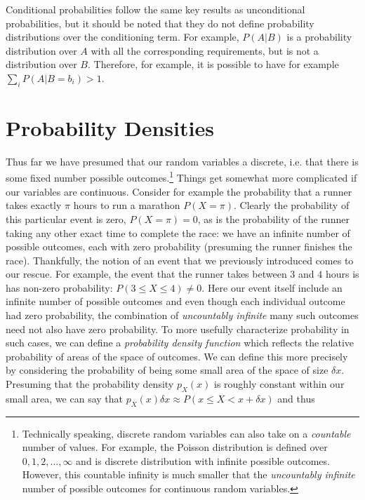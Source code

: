 Conditional probabilities follow  the same key results as unconditional probabilities, but it 
should be noted that they do not define probability distributions over the conditioning term.  
For example, $P(A|B)$ is a probability distribution over $A$ with all the corresponding 
requirements, but is not a distribution over $B$.  Therefore,
for example, it is possible to have for example $\sum_{i} P(A|B=b_i) >1$.

\section{Probability Densities}
\label{sec:prob:den}

Thus far we have presumed that our random variables a discrete, i.e. that there is some fixed
number possible outcomes.\footnote{Technically speaking, discrete random variables can also
	take on a \emph{countable} number of values.  For example, the Poisson distribution is defined
	over $0,1,2,\dots,\infty$ and is discrete distribution with infinite possible outcomes.  
	However, this countable infinity is much smaller that the \emph{uncountably infinite} number
	of possible outcomes for continuous random variables.}
Things get somewhat more complicated if our variables are continuous.  Consider for example
the probability that a runner takes exactly $\pi$ hours to run a marathon $P(X=\pi)$.  
Clearly the probability
of this particular event is zero, $P(X=\pi)=0$, as is the probability of the runner taking any other exact time
to complete the race: we have an infinite number of possible outcomes, each with zero probability
(presuming the runner finishes the race).  Thankfully, the notion of an event that we previously
introduced comes to our rescue.  For example, the event that the runner takes between $3$ and
$4$ hours is has non-zero probability: $P(3\le X \le 4) \neq 0$.  Here our event itself include
an infinite number of possible outcomes and even though each individual outcome had
zero probability, the combination of \emph{uncountably infinite} many such outcomes need
not also have zero probability.  To more usefully characterize probability in such cases, we can
define a \emph{probability density function} which reflects the relative probability of areas of
the space of outcomes.  We can define this more precisely by considering the probability
of being some small area of the space of size $\delta x$.  Presuming that the probability density
$p_{X}(x)$ is roughly constant within our small area, we can say that 
$p_{X}(x)\delta x \approx P(x\le X <x+\delta x)$ and thus 
